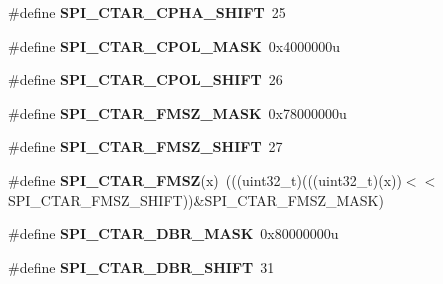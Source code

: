 \begin{DoxyCompactItemize}
\item 
\#define {\bfseries S\+P\+I\+\_\+\+C\+T\+A\+R\+\_\+\+C\+P\+H\+A\+\_\+\+S\+H\+I\+FT}~25\hypertarget{group__SPI__Register__Masks_ga1a27d47d54bd5b51d69b21216b3662b4}{}\label{group__SPI__Register__Masks_ga1a27d47d54bd5b51d69b21216b3662b4}

\item 
\#define {\bfseries S\+P\+I\+\_\+\+C\+T\+A\+R\+\_\+\+C\+P\+O\+L\+\_\+\+M\+A\+SK}~0x4000000u\hypertarget{group__SPI__Register__Masks_ga128560de0ef72566ec53bb208e6ad5ef}{}\label{group__SPI__Register__Masks_ga128560de0ef72566ec53bb208e6ad5ef}

\item 
\#define {\bfseries S\+P\+I\+\_\+\+C\+T\+A\+R\+\_\+\+C\+P\+O\+L\+\_\+\+S\+H\+I\+FT}~26\hypertarget{group__SPI__Register__Masks_gac46d6c45f2f45383d1f6d062a570e81d}{}\label{group__SPI__Register__Masks_gac46d6c45f2f45383d1f6d062a570e81d}

\item 
\#define {\bfseries S\+P\+I\+\_\+\+C\+T\+A\+R\+\_\+\+F\+M\+S\+Z\+\_\+\+M\+A\+SK}~0x78000000u\hypertarget{group__SPI__Register__Masks_ga71b046a902929cf107f46e422092ff33}{}\label{group__SPI__Register__Masks_ga71b046a902929cf107f46e422092ff33}

\item 
\#define {\bfseries S\+P\+I\+\_\+\+C\+T\+A\+R\+\_\+\+F\+M\+S\+Z\+\_\+\+S\+H\+I\+FT}~27\hypertarget{group__SPI__Register__Masks_gaabebaa480c90d32ad8bc580ea2507b8e}{}\label{group__SPI__Register__Masks_gaabebaa480c90d32ad8bc580ea2507b8e}

\item 
\#define {\bfseries S\+P\+I\+\_\+\+C\+T\+A\+R\+\_\+\+F\+M\+SZ}(x)~(((uint32\+\_\+t)(((uint32\+\_\+t)(x))$<$$<$S\+P\+I\+\_\+\+C\+T\+A\+R\+\_\+\+F\+M\+S\+Z\+\_\+\+S\+H\+I\+FT))\&S\+P\+I\+\_\+\+C\+T\+A\+R\+\_\+\+F\+M\+S\+Z\+\_\+\+M\+A\+SK)\hypertarget{group__SPI__Register__Masks_ga217a65114bc44312a9c953c3fd394464}{}\label{group__SPI__Register__Masks_ga217a65114bc44312a9c953c3fd394464}

\item 
\#define {\bfseries S\+P\+I\+\_\+\+C\+T\+A\+R\+\_\+\+D\+B\+R\+\_\+\+M\+A\+SK}~0x80000000u\hypertarget{group__SPI__Register__Masks_ga3347aad10c0b5dc1a5062275e89353b2}{}\label{group__SPI__Register__Masks_ga3347aad10c0b5dc1a5062275e89353b2}

\item 
\#define {\bfseries S\+P\+I\+\_\+\+C\+T\+A\+R\+\_\+\+D\+B\+R\+\_\+\+S\+H\+I\+FT}~31\hypertarget{group__SPI__Register__Masks_ga4600954a3cc5c07f14c1b0e602cec4cd}{}\label{group__SPI__Register__Masks_ga4600954a3cc5c07f14c1b0e602cec4cd}


\end{DoxyCompactItemize}
